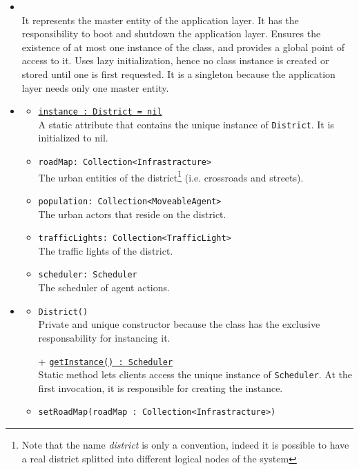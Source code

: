 \begin{itemize}
  \item \textbf{\descr} \\
  It represents the master entity of the application layer. 
  It has the responsibility to boot and shutdown the application layer.
  Ensures the existence of at most one instance of the class, 
  and provides a global point of access to it.
  Uses lazy initialization, hence no class instance is created 
  or stored until one is first requested.
  It is a singleton because the application layer needs 
  only one master entity.
  \item \textbf{\attrs}
  \begin{itemize}
    \item \texttt{\underline{instance : District = nil}} \\
    A static attribute that contains the unique instance of \texttt{District}.
    It is initialized to nil.
    \item \texttt{roadMap: Collection<Infrastracture>} \\
    The urban entities of the district\footnote{Note that the name 
    \textit{district} is only a convention, indeed it is possible to have a 
    real district splitted into different logical nodes of the system}
    (i.e. crossroads and streets). 
    \item \texttt{population: Collection<MoveableAgent>} \\
    The urban actors that reside on the district.
    \item \texttt{trafficLights: Collection<TrafficLight>} \\
    The traffic lights of the district.
    \item \texttt{scheduler: Scheduler} \\
    The scheduler of agent actions.
  \end{itemize}
  \item \textbf{\ops}
  \begin{itemize}
    \item \texttt{District()} \\
    Private and unique constructor because the class has the exclusive 
    responsability for instancing it.
    \item[+] \texttt{\underline{getInstance() : Scheduler}} \\
    Static method lets clients access the unique instance 
    of \texttt{Scheduler}. At the first invocation, it is responsible 
    for creating the instance.
    \item \texttt{setRoadMap(roadMap : Collection<Infrastracture>)} \\

\end{itemize}
\end{itemize}
